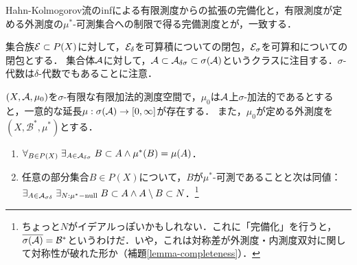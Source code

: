 \documentclass[uplatex, dvipdfmx]{jsreport}
\renewcommand{\B}{\mathcal{B}}
\begin{document}
\begin{tcolorbox}[colframe=ForestGreen, colback=ForestGreen!10!white,breakable,colbacktitle=ForestGreen!40!white,coltitle=black,fonttitle=\bfseries\sffamily,
title=]
    Hahn-Kolmogorov流のinfによる有限測度からの拡張の完備化と，有限測度が定める外測度の$\mu^*$-可測集合への制限で得る完備測度とが，一致する．
\end{tcolorbox}

\begin{notation}
    集合族$\mathcal{E}\subset P(X)$に対して，$\mathcal{E}_\delta$を可算積についての閉包，$\mathcal{E}_\sigma$を可算和についての閉包とする．
    集合体$\mathcal{A}$に対して，$\mathcal{A}\subset\mathcal{A}_{\delta\sigma}\subset\sigma(\mathcal{A})$というクラスに注目する．$\sigma$-代数は$\delta$-代数でもあることに注意．
\end{notation}

\begin{lemma}\label{lemma-complesion}
    $(X,\mathcal{A},\mu_0)$を$\sigma$-有限な有限加法的測度空間で，$\mu_0$は$\mathcal{A}$上$\sigma$-加法的であるとすると，一意的な延長$\mu:\sigma(\mathcal{A})\to[0,\infty]$が存在する．
    また，$\mu_0$が定める外測度を$(X,\B^*,\mu^*)$とする．
    \begin{enumerate}
        \item $\forall_{B\in P(X)}\;\exists_{A\in\mathcal{A}_{\delta\sigma}}\;B\subset A\land\mu^*(B)=\mu(A)$．
        \item 任意の部分集合$B\in P(X)$について，$B$が$\mu^*$-可測であることと次は同値：$\exists_{A\in\mathcal{A}_{\sigma\delta}}\;\exists_{N:\mu^*\mathrm{-null}}\;B\subset A\land A\setminus B\subset N$．\footnote{ちょっと$N$がイデアルっぽいかもしれない．これに「完備化」を行うと，$\o{\sigma(\A)}=\B^*$というわけだ．いや，これは対称差が外測度・内測度双対に関して対称性が破れた形か（補題\ref{lemma-completeness}）．}
    \end{enumerate}
\end{lemma}
\end{document}
